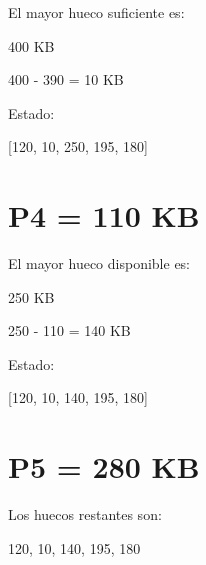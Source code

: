 \documentclass[
  spanish,
  letterpaper,
]{scrbook}
\newenvironment{Shaded}{\begin{snugshade}}{\end{snugshade}}
\newcommand{\NormalTok}[1]{\textcolor[rgb]{0.00,0.23,0.31}{#1}}
\begin{document}
El mayor hueco suficiente es:

\begin{Shaded}
\begin{Highlighting}[]
\NormalTok{400 KB}
\end{Highlighting}
\end{Shaded}

\begin{Shaded}
\begin{Highlighting}[]
\NormalTok{400 {-} 390 = 10 KB}
\end{Highlighting}
\end{Shaded}

Estado:

\begin{Shaded}
\begin{Highlighting}[]
\NormalTok{[120, 10, 250, 195, 180]}
\end{Highlighting}
\end{Shaded}

\section{P4 = 110 KB}\label{p4-110-kb-2}

El mayor hueco disponible es:

\begin{Shaded}
\begin{Highlighting}[]
\NormalTok{250 KB}
\end{Highlighting}
\end{Shaded}

\begin{Shaded}
\begin{Highlighting}[]
\NormalTok{250 {-} 110 = 140 KB}
\end{Highlighting}
\end{Shaded}

Estado:

\begin{Shaded}
\begin{Highlighting}[]
\NormalTok{[120, 10, 140, 195, 180]}
\end{Highlighting}
\end{Shaded}

\section{P5 = 280 KB}\label{p5-280-kb-2}

Los huecos restantes son:

\begin{Shaded}
\begin{Highlighting}[]
\NormalTok{120, 10, 140, 195, 180}
\end{Highlighting}
\end{Shaded}
\end{document}
